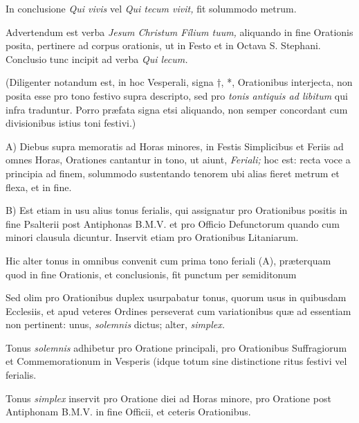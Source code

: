\documentclass[vesperale_romanum.tex]{subfiles}
\begin{document}
In conclusione \textit{Qui vivis} vel \textit{Qui tecum vivit,} fit solummodo metrum.

Advertendum est verba \textit{Jesum Christum Fílium tuum,} aliquando in fine Orationis posita, pertinere ad corpus orationis, ut in Festo et in Octava S. Stephani. Conclusio tunc incipit ad verba \textit{Qui lecum.}

(Diligenter notandum est, in hoc Vesperali, signa †, *, Orationibus interjecta, non posita esse pro tono festivo supra descripto, sed pro \textit{tonis antiquis ad libitum} qui infra traduntur. Porro præfata signa etsi aliquando, non semper concordant cum divisionibus istius toni festivi.)


A) Diebus supra memoratis ad Horas minores, in Festis Simplicibus et Feriis ad omnes Horas, Orationes cantantur in tono, ut aiunt, \textit{Feriali;} hoc est: recta voce a principia ad finem, solummodo sustentando tenorem ubi alias fieret metrum et flexa, et in fine.

B)  Est etiam in usu alius tonus ferialis, qui assignatur pro Orationibus positis in fine Psalterii post Antiphonas B.M.V. et pro Officio Defunctorum quando cum minori clausula dicuntur. Inservit etiam pro Orationibus Litaniarum.

Hic alter tonus in omnibus convenit cum prima tono feriali (A), præterquam quod in fine Orationis, et conclusionis, fit punctum per semiditonum



Sed olim pro Orationibus duplex usurpabatur tonus, quorum usus in quibusdam Ecclesiis, et apud veteres Ordines perseverat cum variationibus quæ ad essentiam non pertinent: unus, \textit{solemnis} dictus; alter, \textit{simplex.}

Tonus \textit{solemnis} adhibetur pro Oratione principali, pro Orationibus Suffragiorum et Commemorationum in Vesperis (idque totum sine distinctione ritus festivi vel ferialis.

Tonus \textit{simplex} inservit pro Oratione diei ad Horas minore, pro Oratione post Antiphonam B.M.V. in fine Officii, et ceteris Orationibus.

\end{document}
